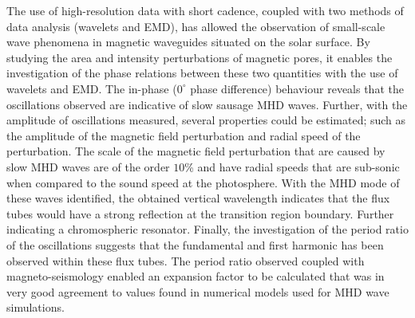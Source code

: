     The use of high-resolution data with short cadence, coupled with two methods of data analysis (wavelets and EMD), has allowed the observation of small-scale wave phenomena in magnetic waveguides situated on the solar surface.
    By studying the area and intensity perturbations of magnetic pores, it enables the investigation of the phase relations between these two quantities with the use of wavelets and EMD.
    The in-phase ($0^\circ$ phase difference) behaviour reveals that the oscillations observed are indicative of slow sausage MHD waves. 
    Further, with the amplitude of oscillations measured, several properties could be estimated; such as the amplitude of the magnetic field perturbation and radial speed of the perturbation.
    The scale of the magnetic field perturbation that are caused by slow MHD waves are of the order $10$\% and have radial speeds that are sub-sonic when compared to the sound speed at the photosphere.  
    With the MHD mode of these waves identified, the obtained vertical wavelength indicates that the flux tubes would have a strong reflection at the transition region boundary.
    Further indicating a chromospheric resonator. 
    Finally, the investigation of the period ratio of the oscillations suggests that the fundamental and first harmonic has been observed within these flux tubes.
    The period ratio observed coupled with magneto-seismology enabled an expansion factor to be calculated that was in very good agreement to values found in numerical models used for MHD wave simulations.